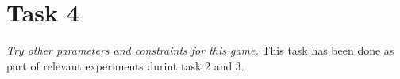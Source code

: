 \section{Task 4}
\label{sec:task4}
\textit{Try other parameters and constraints for this game.}
This task has been done as part of relevant experiments durint task 2 and 3.